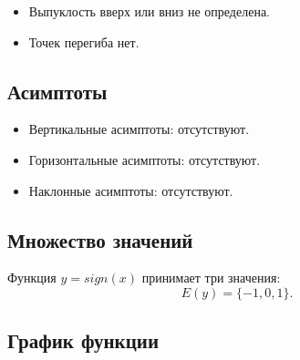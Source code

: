 \begin{flushleft}
		\begin{itemize}
		 	\item Выпуклость вверх или вниз не определена.
		 	\item Точек перегиба нет.
		\end{itemize}
		 
		\subsection*{Асимптоты}
		 
		\begin{itemize}
			\item Вертикальные асимптоты: отсутствуют.
		 	
			\item Горизонтальные асимптоты: отсутствуют.
		 	
		 	\item Наклонные асимптоты: отсутствуют.
		\end{itemize}
		 
		\subsection*{Множество значений}
		Функция $y=sign(x)$ принимает три значения:
		\[E(y)=\{−1,0,1\}.\]
		
		\subsection*{График функции}
		 
		  \begin{center}
		 \end{center}
		 
		\end{flushleft}
	
